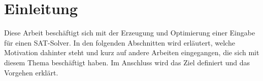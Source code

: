 \chapter{Einleitung}
\label{chp:einleitung}

Diese Arbeit beschäftigt sich mit der Erzeugung und Optimierung einer Eingabe für einen SAT-Solver. In den folgenden Abschnitten
wird erläutert, welche Motivation dahinter steht und kurz auf andere Arbeiten eingegangen, die sich mit diesem Thema beschäftigt haben.
Im Anschluss wird das Ziel definiert und das Vorgehen erklärt.





